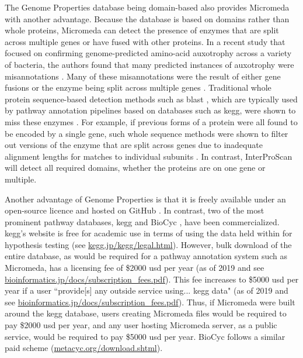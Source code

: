 The Genome Properties database being domain-based also provides Micromeda with 
another advantage. Because the database is based on domains rather than whole 
proteins, Micromeda can detect the presence of enzymes that are split across 
multiple genes or have fused with other proteins. In a recent study that focused 
on confirming genome-predicted amino-acid auxotrophy across a variety of 
bacteria, the authors found that many predicted instances of auxotrophy were 
misannotations \cite{price2018filling}. Many of these misannotations were the 
result of either gene fusions or the enzyme being split across multiple genes 
\cite{price2018filling}. Traditional whole protein sequence-based detection 
methods such as \gls{blast} \cite{altschul1990basic}, which are typically used 
by pathway annotation pipelines based on databases such as \gls{kegg}, were 
shown to miss these enzymes \cite{price2018filling}. For example, if previous 
forms of a protein were all found to be encoded by a single gene, such whole 
sequence methods were shown to filter out versions of the enzyme that are split 
across genes due to inadequate alignment lengths for matches to individual 
subunits \cite{price2018filling}. In contrast, InterProScan will detect all 
required domains, whether the proteins are on one gene or multiple.

Another advantage of Genome Properties is that it is freely available under an 
open-source licence and hosted on GitHub \cite{richardson2018genome}. In 
contrast, two of the most prominent pathway databases, \gls{kegg} and BioCyc 
\cite{karp2005expansion}, have been commercialized. \gls{kegg}'s website is free 
for academic use in terms of using the data held within for hypothesis testing 
(see \href{http://www.kegg.jp/kegg/legal.html}{kegg.jp/kegg/legal.html}). 
However, bulk download of the entire database, as would be required for a 
pathway annotation system such as Micromeda, has a licensing fee of \$2000 
\gls{usd} per year (as of 2019 and see 
\href{https://www.bioinformatics.jp/docs/subscription_fees.pdf}{bioinformatics.jp/docs/subscription\_fees.pdf}). 
This fee increases to \$5000 \gls{usd} per year if a user ``provide[s] any 
outside service using... \gls{kegg} data" (as of 2019 and see 
\href{https://www.bioinformatics.jp/docs/subscription_fees.pdf}{bioinformatics.jp/docs/subscription\_fees.pdf}). 
Thus, if Micromeda were built around the \gls{kegg} database, users creating 
Micromeda files would be required to pay \$2000 \gls{usd} per year, and any user 
hosting Micromeda server, as a public service, would be required to pay \$5000 
\gls{usd} per year. BioCyc follows a similar paid scheme 
(\href{http://metacyc.org/download.shtml}{metacyc.org/download.shtml}). 

